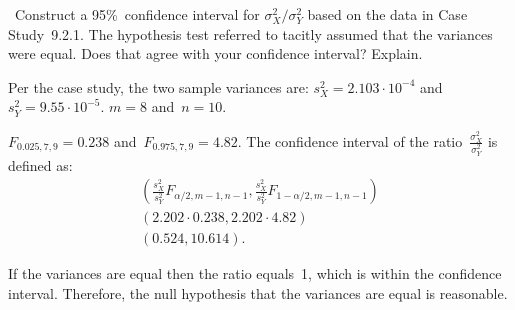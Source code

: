 \begin{problem}
  ~Construct a 95\%~confidence interval for ${\sigma_{X}^2 / \sigma_{Y}^2}$ based on the data in Case Study~9.2.1.  The hypothesis test referred to tacitly assumed that the variances were equal.  Does that agree with your confidence interval? Explain.
\end{problem}

\noindent
Per the case study, the two sample variances are: ${s_{X}^2 = 2.103 \cdot 10^{-4}}$ and~${s_{Y}^2 = 9.55 \cdot 10^{-5}}$. ${m = 8}$ and~${n = 10}$.

\noindent
${F_{0.025,7,9} = 0.238}$ and~${F_{0.975,7,9} = 4.82}$. The confidence interval of the ratio~$\frac{\sigma_{X}^2}{\sigma_{Y}^2}$ is defined as:
\begin{align}
  \left(\frac{s_{X}^2}{s_{Y}^2} F_{\alpha/2,m-1,n-1}, \frac{s_{X}^2}{s_{Y}^2} F_{1-\alpha/2,m-1,n-1} \right) \\
  \left(2.202 \cdot 0.238, 2.202 \cdot 4.82 \right) \\
  \left(0.524,10.614\right) \text{.}
\end{align}

\noindent
If the variances are equal then the ratio equals~1, which is within the confidence interval.  Therefore, the null hypothesis that the variances are equal is reasonable.
